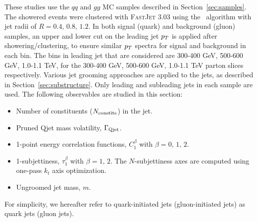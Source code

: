 These studies use the $qq$ and $gg$ MC samples described  in Section~\ref{sec:samples}. 
The showered events were clustered with \textsc{FastJet}
3.03 using
the \antikt~algorithm with jet radii of $R = 0.4,\, 0.8,\, 1.2$. In
both signal (quark) and background (gluon) samples, an upper and lower cut on
the leading jet $p_T$ is applied after showering/clustering, to ensure
similar $p_T$ spectra for signal and background in each \pt bin. The bins
in leading jet \pt that are considered are 300-400 GeV, 500-600 GeV,
1.0-1.1 TeV, for the 300-400 GeV, 500-600 GeV,
1.0-1.1 TeV parton \pt slices respectively. 
Various jet grooming approaches are applied to the jets, as described in Section~\ref{sec:substructure}. 
Only leading and subleading jets in each sample are used. The
following observables are studied in this section:
%
\begin{itemize}
\item Number of constituents ($N_{\rm constits}$) in the jet.
\item Pruned Qjet mass volatility, $\Gamma_{\rm Qjet}$.
\item 1-point energy correlation functions, $C_1^{\beta}$ with $\beta=0,\,1,\,2$.
\item 1-subjettiness, $\tau_1^{\beta}$ with $\beta=1,\,2$. The $N$-subjettiness axes are computed using one-pass $k_t$ axis optimization.
\item Ungroomed jet mass,  $m$.
\end{itemize}
%
For simplicity, we hereafter refer to quark-initiated jets (gluon-initiated jets) as quark jets (gluon jets).

